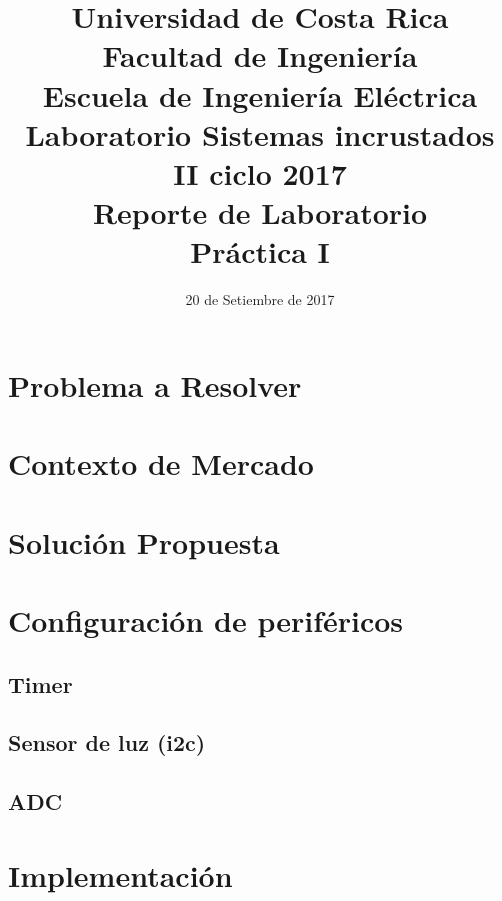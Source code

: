 

\title{Universidad de Costa Rica\\{\small Facultad de Ingeniería\\Escuela de Ingeniería Eléctrica\\
    Laboratorio Sistemas incrustados\\II ciclo 2017\\\vspace*{0.55in} Reporte de Laboratorio}\\ Práctica I \vspace*{1.1in}}
\date{20 de Setiembre de 2017}






\newpage

\section{Problema a Resolver}

\section{Contexto de Mercado}

\section{Solución Propuesta}

\section{Configuración de periféricos}

\subsection{Timer}

\subsection{Sensor de luz (i2c)}

\subsection{ADC}

\section{Implementación}

